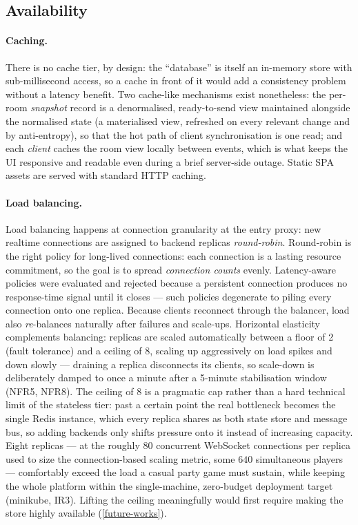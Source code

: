 \documentclass{scrartcl}
\begin{document}
\subsection{Availability}\label{availability}

\paragraph{Caching.}
There is no cache tier, by design: the ``database'' is itself an in-memory
store with sub-millisecond access, so a cache in front of it would add a
consistency problem without a latency benefit. Two cache-like mechanisms
exist nonetheless: the per-room \emph{snapshot} record is a denormalised,
ready-to-send view maintained alongside the normalised state (a
materialised view, refreshed on every relevant change and by anti-entropy),
so that the hot path of client synchronisation is one read; and each
\emph{client} caches the room view locally between events, which is what
keeps the UI responsive and readable even during a brief server-side
outage. Static SPA assets are served with standard HTTP caching.

\paragraph{Load balancing.}
Load balancing happens at connection granularity at the entry proxy:
new realtime connections are assigned to backend replicas
\emph{round-robin}. Round-robin is the right policy for long-lived
connections: each connection is a lasting resource commitment, so the goal
is to spread \emph{connection counts} evenly. Latency-aware policies were
evaluated and rejected because a persistent connection produces no
response-time signal until it closes --- such policies degenerate to piling
every connection onto one replica. Because clients reconnect through the
balancer, load also \emph{re}-balances naturally after failures and
scale-ups. Horizontal elasticity complements balancing: replicas are
scaled automatically between a floor of 2 (fault tolerance) and a ceiling
of 8, scaling up aggressively on load spikes and down slowly --- draining a
replica disconnects its clients, so scale-down is deliberately damped to
once a minute after a 5-minute stabilisation window (NFR5, NFR8).
%
The ceiling of 8 is a pragmatic cap rather than a hard technical limit of
the stateless tier: past a certain point the real bottleneck becomes the
single Redis instance, which every replica shares as both state store and
message bus, so adding backends only shifts pressure onto it instead of
increasing capacity. Eight replicas --- at the roughly 80 concurrent
WebSocket connections per replica used to size the connection-based scaling
metric, some \(640\) simultaneous players --- comfortably exceed the load a
casual party game must sustain, while keeping the whole platform within the
single-machine, zero-budget deployment target (minikube, IR3). Lifting the
ceiling meaningfully would first require making the store
highly available (\cref{future-works}).
\end{document}
